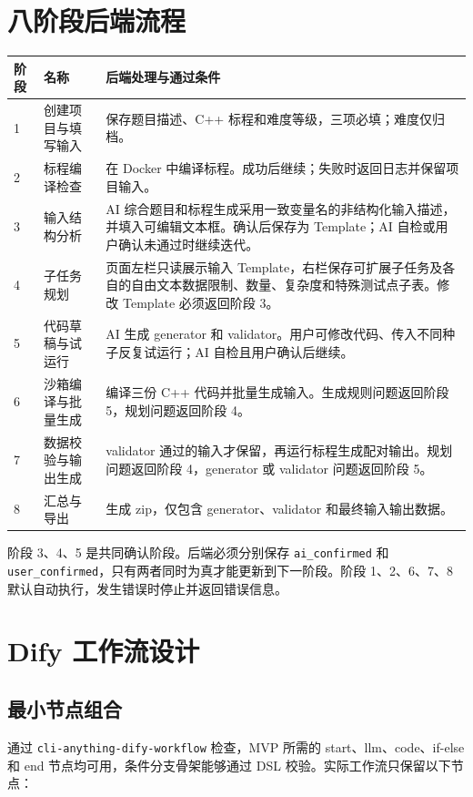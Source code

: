 \documentclass[UTF8,zihao=-4]{ctexart}
\begin{document}
\section{八阶段后端流程}

\begin{longtable}{p{1.4cm}p{3.8cm}p{8.7cm}}
\toprule
阶段 & 名称 & 后端处理与通过条件 \\
\midrule
1 & 创建项目与填写输入 & 保存题目描述、C++ 标程和难度等级，三项必填；难度仅归档。 \\
2 & 标程编译检查 & 在 Docker 中编译标程。成功后继续；失败时返回日志并保留项目输入。 \\
3 & 输入结构分析 & AI 综合题目和标程生成采用一致变量名的非结构化输入描述，并填入可编辑文本框。确认后保存为 Template；AI 自检或用户确认未通过时继续迭代。 \\
4 & 子任务规划 & 页面左栏只读展示输入 Template，右栏保存可扩展子任务及各自的自由文本数据限制、数量、复杂度和特殊测试点子表。修改 Template 必须返回阶段 3。 \\
5 & 代码草稿与试运行 & AI 生成 generator 和 validator。用户可修改代码、传入不同种子反复试运行；AI 自检且用户确认后继续。 \\
6 & 沙箱编译与批量生成 & 编译三份 C++ 代码并批量生成输入。生成规则问题返回阶段 5，规划问题返回阶段 4。 \\
7 & 数据校验与输出生成 & validator 通过的输入才保留，再运行标程生成配对输出。规划问题返回阶段 4，generator 或 validator 问题返回阶段 5。 \\
8 & 汇总与导出 & 生成 zip，仅包含 generator、validator 和最终输入输出数据。 \\
\bottomrule
\end{longtable}

阶段 3、4、5 是共同确认阶段。后端必须分别保存 \texttt{ai\_confirmed} 和 \texttt{user\_confirmed}，只有两者同时为真才能更新到下一阶段。阶段 1、2、6、7、8 默认自动执行，发生错误时停止并返回错误信息。

\section{Dify 工作流设计}

\subsection{最小节点组合}

通过 \texttt{cli-anything-dify-workflow} 检查，MVP 所需的 start、llm、code、if-else 和 end 节点均可用，条件分支骨架能够通过 DSL 校验。实际工作流只保留以下节点：
\end{document}
